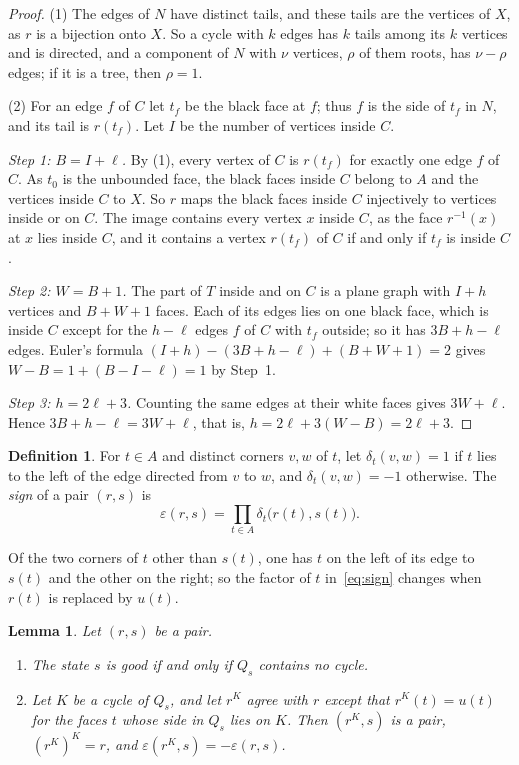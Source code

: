 \documentclass[a4paper]{amsart}
\numberwithin{equation}{section}
\newtheorem{lemma}[equation]{Lemma}
\theoremstyle{definition}
\newtheorem{definition}[equation]{Definition}
\newcommand{\eps}{\varepsilon}
\newcommand{\step}[1]{\emph{#1}\enspace}
\begin{document}
\begin{proof}
(1) The edges of $N$ have distinct tails, and these tails are the vertices of $X$, as $r$ is a bijection onto $X$.
So a cycle with $k$ edges has $k$ tails among its $k$ vertices and is directed, and a component of $N$ with $\nu$ vertices, $\rho$ of them roots, has $\nu-\rho$ edges; if it is a tree, then $\rho=1$.

(2) For an edge $f$ of $C$ let $t_f$ be the black face at $f$; thus $f$ is the side of $t_f$ in $N$, and its tail is $r(t_f)$.
Let $I$ be the number of vertices inside $C$.

\step{Step 1: $B=I+\ell$.}
By (1), every vertex of $C$ is $r(t_f)$ for exactly one edge $f$ of $C$.
As $t_0$ is the unbounded face, the black faces inside $C$ belong to $A$ and the vertices inside $C$ to $X$.
So $r$ maps the black faces inside $C$ injectively to vertices inside or on $C$.
The image contains every vertex $x$ inside $C$, as the face $r^{-1}(x)$ at $x$ lies inside $C$, and it contains a vertex $r(t_f)$ of $C$ if and only if $t_f$ is inside $C$.

\step{Step 2: $W=B+1$.}
The part of $T$ inside and on $C$ is a plane graph with $I+h$ vertices and $B+W+1$ faces.
Each of its edges lies on one black face, which is inside $C$ except for the $h-\ell$ edges $f$ of $C$ with $t_f$ outside; so it has $3B+h-\ell$ edges.
Euler's formula $(I+h)-(3B+h-\ell)+(B+W+1)=2$ gives $W-B=1+(B-I-\ell)=1$ by Step~1.

\step{Step 3: $h=2\ell+3$.}
Counting the same edges at their white faces gives $3W+\ell$.
Hence $3B+h-\ell=3W+\ell$, that is, $h=2\ell+3(W-B)=2\ell+3$.
\end{proof}

\begin{definition}\label{def:sign}
For $t\in A$ and distinct corners $v,w$ of $t$, let $\delta_t(v,w)=1$ if $t$ lies to the left of the edge directed from $v$ to $w$, and $\delta_t(v,w)=-1$ otherwise.
The \emph{sign} of a pair $(r,s)$ is
\begin{equation}\label{eq:sign}
\eps(r,s)=\prod_{t\in A}\delta_t\bigl(r(t),s(t)\bigr).
\end{equation}
\end{definition}

Of the two corners of $t$ other than $s(t)$, one has $t$ on the left of its edge to $s(t)$ and the other on the right; so the factor of $t$ in~\eqref{eq:sign} changes when $r(t)$ is replaced by $u(t)$.

\begin{lemma}\label{lem:pair}
Let $(r,s)$ be a pair.
\begin{enumerate}
\item The state $s$ is good if and only if $Q_s$ contains no cycle.
\item Let $K$ be a cycle of $Q_s$, and let $r^K$ agree with $r$ except that $r^K(t)=u(t)$ for the faces $t$ whose side in $Q_s$ lies on $K$.
Then $(r^K,s)$ is a pair, $(r^K)^K=r$, and $\eps(r^K,s)=-\eps(r,s)$.
\end{enumerate}
\end{lemma}
\end{document}
